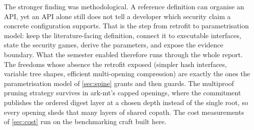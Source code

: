The stronger finding was methodological.  A reference definition can organise
an API, yet an API alone still does not tell a developer which security claim a
concrete configuration supports.  That is the step from retrofit to
parametrisation model: keep the literature-facing definition, connect it to
executable interfaces, state the security games, derive the parameters, and
expose the evidence boundary.  What the semester enabled therefore runs through
the whole report.  The freedoms whose absence the retrofit exposed (simpler
hash interfaces, variable tree shapes, efficient multi-opening compression) are
exactly the ones the parametrisation model of \cref{sec:spine} grants and then
guards.  The multiproof pruning strategy survives in \textsf{ark-mt}'s capped
openings, where the commitment publishes the ordered digest layer at a chosen
depth instead of the single root, so every opening sheds that many layers of
shared copath.  The cost measurements of \cref{sec:cost} run on the
benchmarking craft built here.
